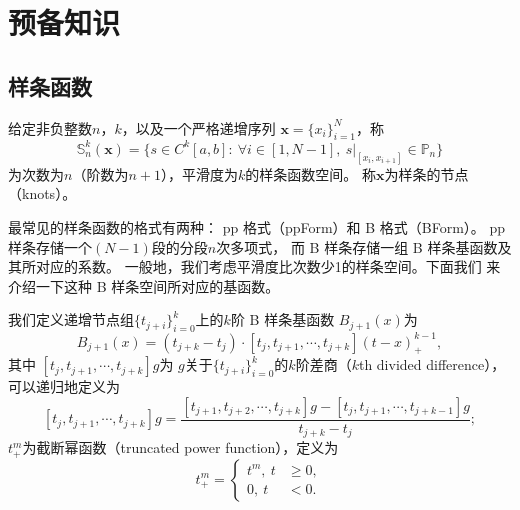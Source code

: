 \cleardoublepage

\section{预备知识}
\label{sec:FINALbuildingknowledge}

\subsection{样条函数}
\label{subsec:FINALsplinespace}
\begin{defn}[样条函数空间]
  \label{def:FINALsplinespace}
  给定非负整数$n$，$k$，以及一个严格递增序列
  $\mathbf{x}=\{x_{i}\}_{i=1}^{N}$，称
  \begin{equation}
    \label{eq:FINALsplinespace}
    \mathbb{S}_{n}^{k}(\mathbf{x})
    =\{s\in C^{k}[a,b]:\
    \forall i\in [1,N-1],\
    s|_{[x_{i},x_{i+1}]}\in \mathbb{P}_{n}\}
  \end{equation}
  为次数为$n$（阶数为$n+1$），平滑度为$k$的样条函数空间。
  称$\mathbf{x}$为样条的节点（knots）。
\end{defn}

最常见的样条函数的格式有两种： pp 格式（ppForm）和
B 格式（BForm）。
pp 样条存储一个$(N-1)$段的分段$n$次多项式，
而 B 样条存储一组 B 样条基函数及其所对应的系数。
一般地，我们考虑平滑度比次数少1的样条空间。下面我们
来介绍一下这种 B 样条空间所对应的基函数。

\begin{defn}[ B 样条基函数]
  \label{def:FINALbasicBspline}
  我们定义递增节点组$\{t_{j+i}\}_{i=0}^{k}$上的$k$阶 \textnormal{B} 样条基函数
  $B_{j+1}(x)$为
  \begin{equation}
  \label{eq:FINALbasicBSpline}
  B_{j+1}(x)=
  (t_{j+k}-t_{j})\cdot [t_{j},t_{j+1},\cdots,t_{j+k}](t-x)_{+}^{k-1},
  \end{equation}
  其中
  $[t_{j},t_{j+1},\cdots,t_{j+k}]g$为
  $g$关于$\{t_{j+i}\}_{i=0}^{k}$的$k$阶差商（$k$th divided difference），
  可以递归地定义为
  \begin{equation}
    \label{eq:FINALdividedDifference}
    [t_{j},t_{j+1},\cdots,t_{j+k}]g
    =\frac{[t_{j+1},t_{j+2},\cdots,t_{j+k}]g-
      [t_{j},t_{j+1},\cdots,t_{j+k-1}]g}{t_{j+k}-t_{j}};
  \end{equation}
  $t_{+}^{m}$为截断幂函数（truncated power function），定义为
  \begin{equation}
    \label{eq:FINALtruncatedPowerFunc}
    t_{+}^{m}=
    \left\lbrace
    \begin{aligned}
      t^{m},\ t&\ge 0,\\
      0,\ t&<0.
    \end{aligned}
    \right.
  \end{equation}
\end{defn}

